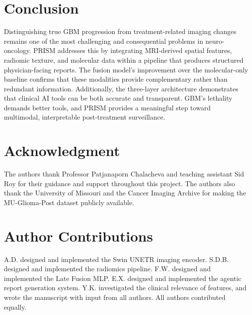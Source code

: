 \documentclass[letterpaper, 10pt, conference]{IEEEtran}
\begin{document}
\section{Conclusion}
Distinguishing true GBM progression from treatment-related imaging changes remains one of the most challenging and
consequential problems in neuro-oncology. PRISM addresses this by integrating MRI-derived spatial features, radiomic
texture, and molecular data within a pipeline that produces structured physician-facing reports. The fusion model's
improvement over the molecular-only baseline confirms that these modalities provide complementary rather than
redundant information. Additionally, the three-layer architecture demonstrates that clinical AI tools can be both
accurate and transparent. GBM's lethality demands better tools, and PRISM provides a meaningful step toward
multimodal, interpretable post-treatment surveillance.

\section*{Acknowledgment}
The authors thank Professor Patjanaporn Chalacheva and teaching assistant Sid Roy for their guidance and support
throughout this project. The authors also thank the University of Missouri and the Cancer Imaging Archive for making
the MU-Glioma-Post dataset publicly available.

\section*{Author Contributions}
A.D. designed and implemented the Swin UNETR imaging encoder. S.D.B. designed and implemented the radiomics
pipeline. F.W. designed and implemented the Late Fusion MLP. E.X. designed and implemented the agentic report
generation system. Y.K. investigated the clinical relevance of features, and wrote the manuscript with input from all
authors. All authors contributed equally.
\end{document}
